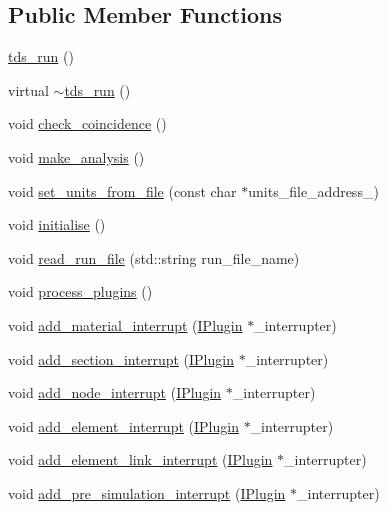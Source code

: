 \subsection*{Public Member Functions}
\begin{DoxyCompactItemize}
\item 
\hyperlink{classtds__run_a0ba74f360c64a7e2f3f8959dc1fed2df}{tds\-\_\-run} ()
\item 
virtual \hyperlink{classtds__run_aa2b9a0552e50ff324d03c3d420fff38c}{$\sim$tds\-\_\-run} ()
\item 
void \hyperlink{classtds__run_a9abb2736c161cf2156e3e163a04a0cd4}{check\-\_\-coincidence} ()
\item 
void \hyperlink{classtds__run_a35a3ff44173673f3128e3ef53f2ed88d}{make\-\_\-analysis} ()
\item 
void \hyperlink{classtds__run_abd30ce52c369e4df8604e572d6927284}{set\-\_\-units\-\_\-from\-\_\-file} (const char $\ast$units\-\_\-file\-\_\-address\-\_\-)
\item 
void \hyperlink{classtds__run_ae1603d896969d71fa6547abe35223f61}{initialise} ()
\item 
void \hyperlink{classtds__run_ad032df448d1a63322c2bf79f5a0096b2}{read\-\_\-run\-\_\-file} (std\-::string run\-\_\-file\-\_\-name)
\item 
void \hyperlink{classtds__run_adff2cb3deec1b483622a7dda413dda31}{process\-\_\-plugins} ()
\item 
void \hyperlink{classtds__run_a362d316bd24de6cbf82d5d3da5d4f2c0}{add\-\_\-material\-\_\-interrupt} (\hyperlink{classIPlugin}{I\-Plugin} $\ast$\-\_\-interrupter)
\item 
void \hyperlink{classtds__run_a3839266313d0fc9e3413c28dda530482}{add\-\_\-section\-\_\-interrupt} (\hyperlink{classIPlugin}{I\-Plugin} $\ast$\-\_\-interrupter)
\item 
void \hyperlink{classtds__run_ab6675a0bebfd5bed698acd4dea878d41}{add\-\_\-node\-\_\-interrupt} (\hyperlink{classIPlugin}{I\-Plugin} $\ast$\-\_\-interrupter)
\item 
void \hyperlink{classtds__run_a312b07f0d3efffd1642dfa87895ff4cc}{add\-\_\-element\-\_\-interrupt} (\hyperlink{classIPlugin}{I\-Plugin} $\ast$\-\_\-interrupter)
\item 
void \hyperlink{classtds__run_ac40a3ad881c24c25897bd1b09d78a078}{add\-\_\-element\-\_\-link\-\_\-interrupt} (\hyperlink{classIPlugin}{I\-Plugin} $\ast$\-\_\-interrupter)
\item 
void \hyperlink{classtds__run_ab4ec00a4d9f22819365b66477c10ae91}{add\-\_\-pre\-\_\-simulation\-\_\-interrupt} (\hyperlink{classIPlugin}{I\-Plugin} $\ast$\-\_\-interrupter)

\end{DoxyCompactItemize}
